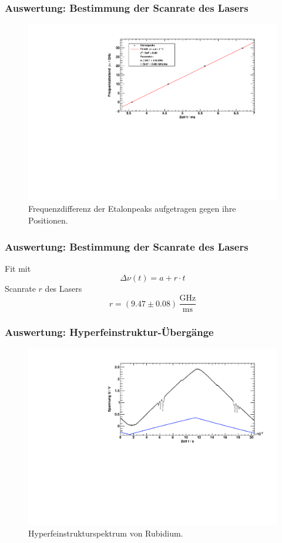 \begin{frame}
\frametitle{Auswertung: Bestimmung der Scanrate des Lasers}
  \begin{figure}[H]
      \centering
      \includegraphics[width=\textwidth]{../img/down-etalon_zoom-etalon_calibration.pdf}
      \caption{Frequenzdifferenz der Etalonpeaks aufgetragen gegen ihre Positionen.}
  \end{figure}
\end{frame}


\begin{frame}
\frametitle{Auswertung: Bestimmung der Scanrate des Lasers}
Fit mit
\begin{equation*}
    \Delta \nu(t) = a + r \cdot t
\end{equation*}
Scanrate $r$ des Lasers
\begin{equation*}
    r = (9.47 \pm 0.08)\,\frac{\text{GHz}}{\text{ms}}
\end{equation*}
\end{frame}


\begin{frame}
\frametitle{Auswertung: Hyperfeinstruktur-Übergänge}
\begin{figure}[H]
    \centering
    \includegraphics[width=\textwidth]{../img/down-hfs.pdf}
    \caption{Hyperfeinstrukturspektrum von Rubidium.}
\end{figure}
\end{frame}


